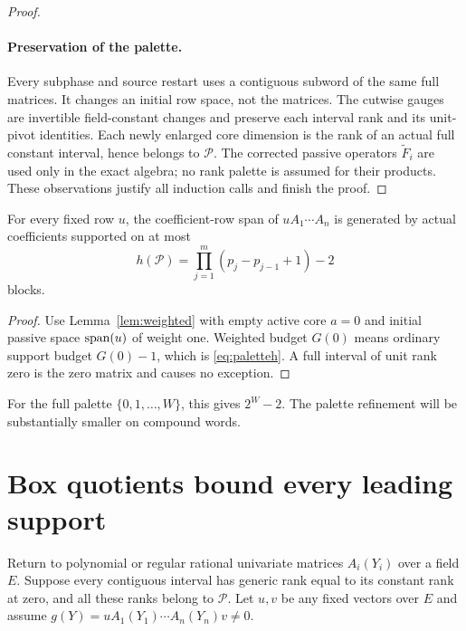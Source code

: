 \begin{proof}
\paragraph{Preservation of the palette.}
Every subphase and source restart uses a contiguous subword of the
same full matrices. It changes an initial row space, not the matrices.
The cutwise gauges are invertible field-constant changes and preserve
each interval rank and its unit-pivot identities. Each newly enlarged
core dimension is the rank of an actual full constant interval, hence
belongs to $\mathcal P$. The corrected passive operators
$\widetilde F_i$ are used only in the exact algebra; no rank palette
is assumed for their products. These observations justify all
induction calls and finish the proof.
\end{proof}

\begin{theorem}\label{thm:row}
For every fixed row $u$, the coefficient-row span of
$uA_1\cdots A_n$ is generated by actual coefficients supported on at
most
\begin{equation}\label{eq:paletteh}
 h(\mathcal P)=\prod_{j=1}^{m}(p_j-p_{j-1}+1)-2
\end{equation}
blocks.
\end{theorem}
\begin{proof}
Use Lemma~\ref{lem:weighted} with empty active core $a=0$ and initial
passive space $\operatorname{span}(u)$ of weight one. Weighted budget $G(0)$ means
ordinary support budget $G(0)-1$, which is \eqref{eq:paletteh}.
A full interval of unit rank zero is the zero matrix and causes no
exception.
\end{proof}

For the full palette $\{0,1,\ldots,W\}$, this gives $2^W-2$.
The palette refinement will be substantially smaller on compound words.

\section{Box quotients bound every leading support}

Return to polynomial or regular rational univariate matrices
$A_i(Y_i)$ over a field $E$. Suppose every contiguous interval has
generic rank equal to its constant rank at zero, and all these ranks
belong to $\mathcal P$. Let $u,v$ be any fixed vectors over $E$ and
assume $g(Y)=uA_1(Y_1)\cdots A_n(Y_n)v\ne0$.

